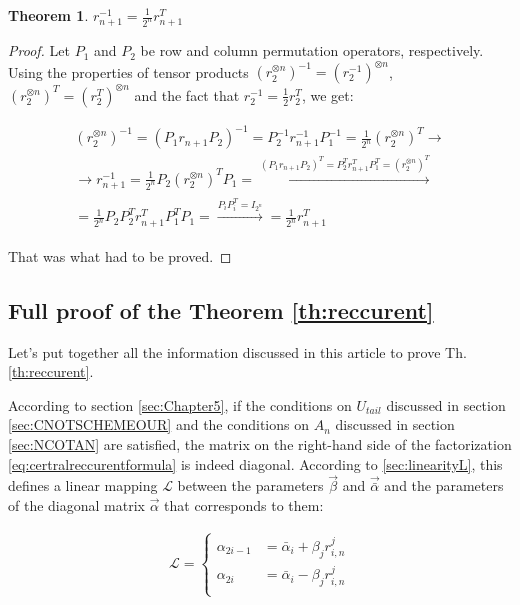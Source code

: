 \documentclass[a4paper, openany, 12pt]{article}
\newtheorem{theorem}{Theorem}
\theoremstyle{remark}
\theoremstyle{definition}
\newcommand{\ot}{\otimes}
\begin{document}
\begin{theorem}{$r_{n+1}^{-1} = \frac{1}{2^n}r_{n+1}^T$ \label{th:inverse}}
\end{theorem}
\begin{proof}Let $P_1$ and $P_2$ be row and column permutation operators, respectively.
Using the properties of tensor products $(r_2^{\ot n})^{-1} =(r_2^{-1})^{\ot n}$, $(r_2^{\ot n})^{T}=(r_2^{T})^{\ot n}$ and the fact that $r_2^{-1} = \frac{1}{2}r_2^T$, we get:

        \begin{multline}
         (r_2^{\ot n})^{-1} = (P_1 r_{n+1} P_2)^{-1} = P_2^{-1}r_{n+1}^{-1}P_1^{-1} = \frac{1}{2^n}(r_2^{\ot n})^T \xrightarrow{}\\ \xrightarrow{}r_{n+1}^{-1} = \frac{1}{2^n}P_2(r_2^{\ot n})^TP_1 =\xrightarrow[]{(P_1r_{n+1}P_2)^T = P_2^Tr_{n+1}^TP_1^T = (r_2^{\ot n})^T}\\ = \frac{1}{2^n} P_2P_2^Tr_{n+1}^TP_1^TP_1 =\xrightarrow[]{P_iP_i^T = I_{2^n}}= \frac{1}{2^n} r_{n+1}^T
         \end{multline}



        That was what had to be proved.
\end{proof}

\subsection{Full proof of the Theorem \ref{th:reccurent}\label{sec:fullproof}}


Let's put together all the information discussed in this article to prove Th. \ref{th:reccurent}.

According to section \ref{sec:Chapter5}, if the conditions on $U_{tail}$ discussed in section \ref{sec:CNOTSCHEMEOUR} and the conditions on $A_n$ discussed in section \ref{sec:NCOTAN} are satisfied, the matrix on the right-hand side of the factorization \eqref{eq:certralreccurentformula} is indeed diagonal. According to \ref{sec:linearityL}, this defines a linear mapping $\mathcal{L}$ between the parameters $\vec\beta$ and $\vec{\bar\alpha}$ and the parameters of the diagonal matrix $\vec\alpha$ that corresponds to them:

\begin{align}
\mathcal{L} =
\begin{cases}
\alpha_{2i-1} &= \bar\alpha_i + \beta_jr^j_{i,n} \\
\alpha_{2i} &= \bar\alpha_i - \beta_jr^j_{i,n} \\
\end{cases}
\end{align}
\end{document}
